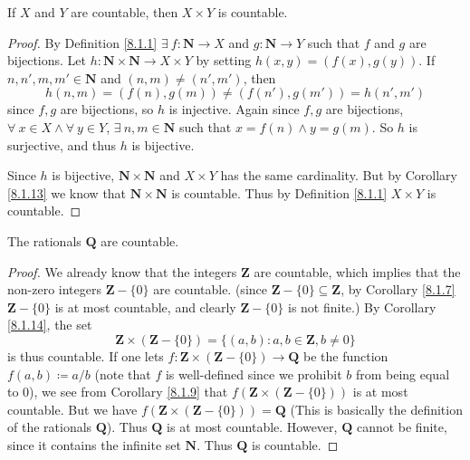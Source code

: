 \begin{corollary}\label{8.1.14}
    If \(X\) and \(Y\) are countable, then \(X \times Y\) is countable.
\end{corollary}

\begin{proof}
    By Definition \ref{8.1.1} \(\exists\ f : \mathbf{N} \to X\) and \(g : \mathbf{N} \to Y\) such that \(f\) and \(g\) are bijections.
    Let \(h : \mathbf{N} \times \mathbf{N} \to X \times Y\) by setting \(h(x, y) = (f(x), g(y))\).
    If \(n, n', m, m' \in \mathbf{N}\) and \((n, m) \neq (n', m')\), then
    \[
        h(n, m) = (f(n), g(m)) \neq (f(n'), g(m')) = h(n', m')
    \]
    since \(f, g\) are bijections, so \(h\) is injective.
    Again since \(f, g\) are bijections, \(\forall\ x \in X \land \forall\ y \in Y\), \(\exists\ n, m \in \mathbf{N}\) such that \(x = f(n) \land y = g(m)\).
    So \(h\) is surjective, and thus \(h\) is bijective.

    Since \(h\) is bijective, \(\mathbf{N} \times \mathbf{N}\) and \(X \times Y\) has the same cardinality.
    But by Corollary \ref{8.1.13} we know that \(\mathbf{N} \times \mathbf{N}\) is countable.
    Thus by Definition \ref{8.1.1} \(X \times Y\) is countable.
\end{proof}

\begin{corollary}\label{8.1.15}
    The rationals \(\mathbf{Q}\) are countable.
\end{corollary}

\begin{proof}
    We already know that the integers \(\mathbf{Z}\) are countable, which implies that the non-zero integers \(\mathbf{Z} - \{0\}\) are countable.
    (since \(\mathbf{Z} - \{0\} \subseteq \mathbf{Z}\), by Corollary \ref{8.1.7} \(\mathbf{Z} - \{0\}\) is at most countable, and clearly \(\mathbf{Z} - \{0\}\) is not finite.)
    By Corollary \ref{8.1.14}, the set
    \[
        \mathbf{Z} \times (\mathbf{Z} - \{0\}) = \{(a, b) : a, b \in \mathbf{Z}, b \neq 0\}
    \]
    is thus countable.
    If one lets \(f : \mathbf{Z} \times (\mathbf{Z} - \{0\}) \to \mathbf{Q}\) be the function \(f(a, b) \coloneqq a / b\)
    (note that \(f\) is well-defined since we prohibit \(b\) from being equal to \(0\)), we see from Corollary \ref{8.1.9} that \(f(\mathbf{Z} \times (\mathbf{Z} - \{0\}))\) is at most countable.
    But we have \(f(\mathbf{Z} \times (\mathbf{Z} - \{0\})) = \mathbf{Q}\)
    (This is basically the definition of the rationals \(\mathbf{Q}\)).
    Thus \(\mathbf{Q}\) is at most countable.
    However, \(\mathbf{Q}\) cannot be finite, since it contains the infinite set \(\mathbf{N}\).
    Thus \(\mathbf{Q}\) is countable.
\end{proof}

